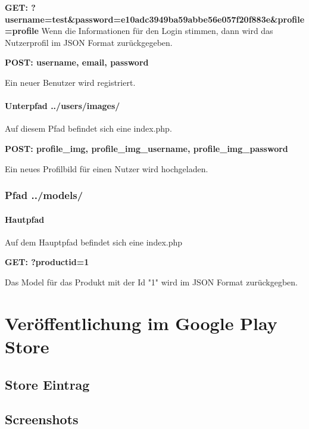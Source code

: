 \documentclass{scrartcl}
\begin{document}
\noindent \textbf{GET: ?username=test\&password=e10adc3949ba59abbe56e057f20f883e\&profile=profile}
Wenn die Informationen für den Login stimmen, dann wird das Nutzerprofil im JSON Format zurückgegeben. \newline

\noindent \textbf{POST: username, email, password}

\noindent Ein neuer Benutzer wird registriert. \newline 

\paragraph{Unterpfad ../users/images/}

Auf diesem Pfad befindet sich eine index.php. \newline 

\noindent \textbf{POST: profile\_img, profile\_img\_username, profile\_img\_password}

\noindent Ein neues Profilbild für einen Nutzer wird hochgeladen.


\subsubsection{Pfad ../models/}

\paragraph{Hautpfad}
 
Auf dem Hauptpfad befindet sich eine index.php \newline 

\noindent \textbf{GET: ?productid=1}

\noindent  Das Model für das Produkt mit der Id "1" wird im JSON Format zurückgegben.

\newpage

\section{Veröffentlichung im Google Play Store}

\subsection{Store Eintrag}

\subsection{Screenshots}
\end{document}
